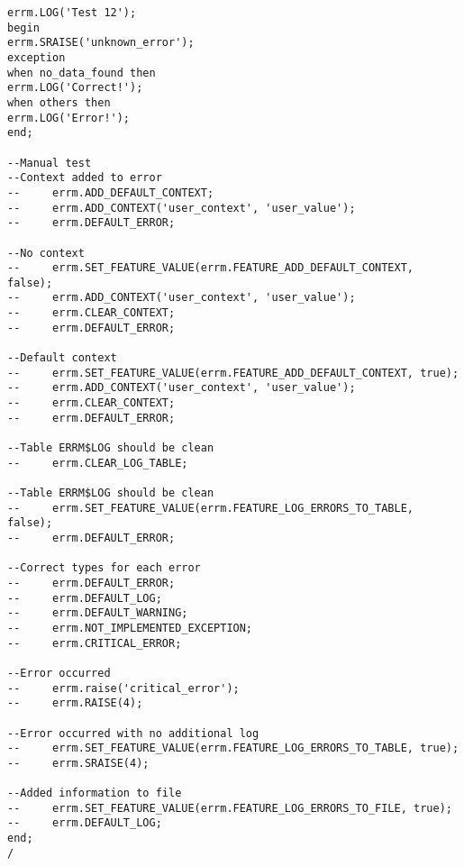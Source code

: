 \begin{verbatim}
errm.LOG('Test 12');
begin
errm.SRAISE('unknown_error');
exception
when no_data_found then
errm.LOG('Correct!');
when others then
errm.LOG('Error!');
end;

--Manual test
--Context added to error
--     errm.ADD_DEFAULT_CONTEXT;
--     errm.ADD_CONTEXT('user_context', 'user_value');
--     errm.DEFAULT_ERROR;

--No context
--     errm.SET_FEATURE_VALUE(errm.FEATURE_ADD_DEFAULT_CONTEXT, false);
--     errm.ADD_CONTEXT('user_context', 'user_value');
--     errm.CLEAR_CONTEXT;
--     errm.DEFAULT_ERROR;

--Default context
--     errm.SET_FEATURE_VALUE(errm.FEATURE_ADD_DEFAULT_CONTEXT, true);
--     errm.ADD_CONTEXT('user_context', 'user_value');
--     errm.CLEAR_CONTEXT;
--     errm.DEFAULT_ERROR;

--Table ERRM$LOG should be clean
--     errm.CLEAR_LOG_TABLE;

--Table ERRM$LOG should be clean
--     errm.SET_FEATURE_VALUE(errm.FEATURE_LOG_ERRORS_TO_TABLE, false);
--     errm.DEFAULT_ERROR;

--Correct types for each error
--     errm.DEFAULT_ERROR;
--     errm.DEFAULT_LOG;
--     errm.DEFAULT_WARNING;
--     errm.NOT_IMPLEMENTED_EXCEPTION;
--     errm.CRITICAL_ERROR;

--Error occurred
--     errm.raise('critical_error');
--     errm.RAISE(4);

--Error occurred with no additional log
--     errm.SET_FEATURE_VALUE(errm.FEATURE_LOG_ERRORS_TO_TABLE, true);
--     errm.SRAISE(4);

--Added information to file
--     errm.SET_FEATURE_VALUE(errm.FEATURE_LOG_ERRORS_TO_FILE, true);
--     errm.DEFAULT_LOG;
end;
/
\end{verbatim}
